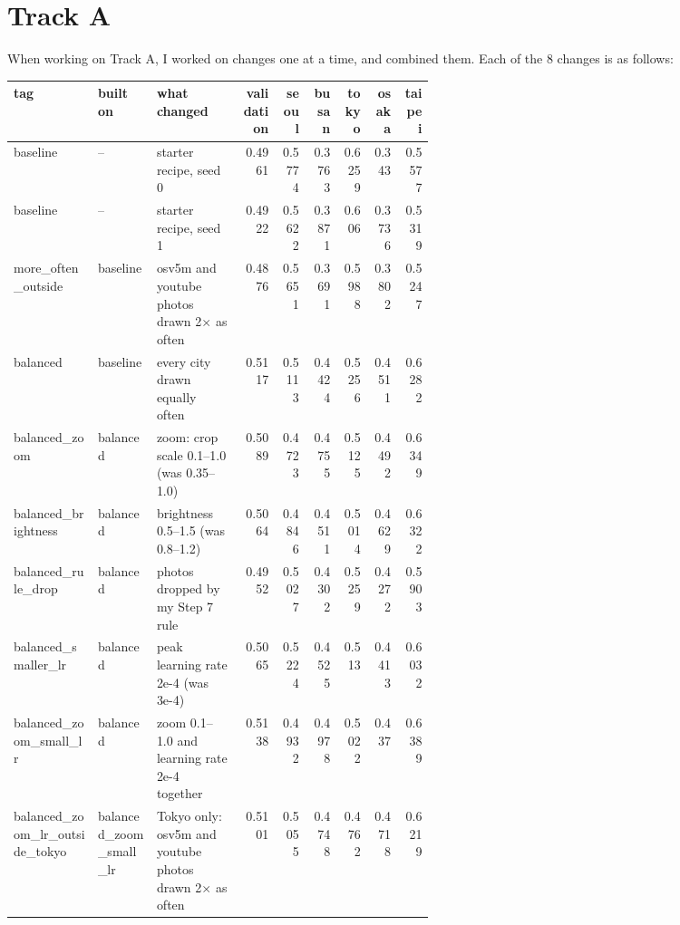 \documentclass[11pt]{article}
\begin{document}
\makeheader



\section*{Track A}

When working on Track A, I worked on changes one at a time, and combined them. Each of the 8 changes is as follows:

\begin{center}\scriptsize
\begin{tabular}{>{\raggedright\arraybackslash}p{0.2\linewidth}>{\raggedright\arraybackslash}p{0.14\linewidth}>{\raggedright\arraybackslash}p{0.2\linewidth}rrrrrr}
\toprule
tag & built on & what changed & validation & seoul & busan & tokyo & osaka & taipei \\
\midrule
baseline & -- & starter recipe, seed 0 & 0.4961 & 0.5774 & 0.3763 & 0.6259 & 0.343 & 0.5577 \\
baseline & -- & starter recipe, seed 1 & 0.4922 & 0.5622 & 0.3871 & 0.606 & 0.3736 & 0.5319 \\
more\_\allowbreak{}often\_\allowbreak{}outside & baseline & osv5m and youtube photos drawn 2$\times$ as often & 0.4876 & 0.5651 & 0.3691 & 0.5988 & 0.3802 & 0.5247 \\
balanced & baseline & every city drawn equally often & 0.5117 & 0.5113 & 0.4424 & 0.5256 & 0.4511 & 0.6282 \\
balanced\_\allowbreak{}zoom & balanced & zoom: crop scale 0.1--1.0 (was 0.35--1.0) & 0.5089 & 0.4723 & 0.4755 & 0.5125 & 0.4492 & 0.6349 \\
balanced\_\allowbreak{}brightness & balanced & brightness 0.5--1.5 (was 0.8--1.2) & 0.5064 & 0.4846 & 0.4511 & 0.5014 & 0.4629 & 0.6322 \\
balanced\_\allowbreak{}rule\_\allowbreak{}drop & balanced & 61 photos dropped by my Step 7 rule & 0.4952 & 0.5027 & 0.4302 & 0.5259 & 0.4272 & 0.5903 \\
balanced\_\allowbreak{}smaller\_\allowbreak{}lr & balanced & peak learning rate 2e-4 (was 3e-4) & 0.5065 & 0.5224 & 0.4525 & 0.513 & 0.4413 & 0.6032 \\
balanced\_\allowbreak{}zoom\_\allowbreak{}small\_\allowbreak{}lr & balanced & zoom 0.1--1.0 and learning rate 2e-4 together & 0.5138 & 0.4932 & 0.4978 & 0.5022 & 0.437 & 0.6389 \\
balanced\_\allowbreak{}zoom\_\allowbreak{}lr\_\allowbreak{}outside\_\allowbreak{}tokyo & balanced\_\allowbreak{}zoom\_\allowbreak{}small\_\allowbreak{}lr & Tokyo only: osv5m and youtube photos drawn 2$\times$ as often & 0.5101 & 0.5055 & 0.4748 & 0.4762 & 0.4718 & 0.6219 \\
\bottomrule
\end{tabular}
\end{center}
\end{document}
